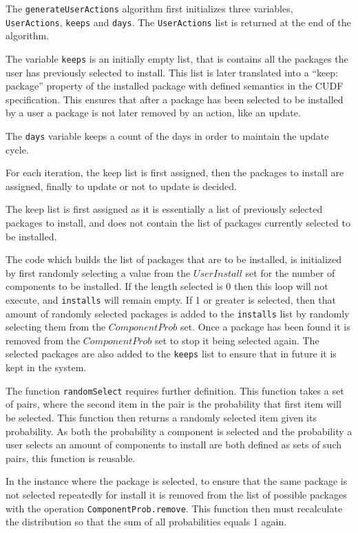 The \verb+generateUserActions+ algorithm first initializes three variables, \verb+UserActions+, \verb+keeps+ and \verb+days+.
The \verb+UserActions+ list is returned at the end of the algorithm.

The variable \verb+keeps+ is an initially empty list, that is contains all the packages the user has previously selected to install.
This list is later translated into a ``keep: package'' property of the installed package with defined semantics in the CUDF specification.
This ensures that after a package has been selected to be installed by a user a package is not later removed by an action, like an update.

The \verb+days+ variable keeps a count of the days in order to maintain the update cycle. 

For each iteration, the keep list is first assigned, then the packages to install are assigned, finally to update or not to update is decided.

The keep list is first assigned as it is essentially a list of previously selected packages to install, and does not contain the list of packages currently selected to be installed.

The code which builds the list of packages that are to be installed, is initialized by first randomly selecting a value from the $UserInstall$ set for the number of components to be installed.
If the length selected is 0 then this loop will not execute, and \verb+installs+ will remain empty.
If 1 or greater is selected, then that amount of randomly selected packages is added to the \verb+installs+ list by randomly selecting them from the $ComponentProb$ set.
Once a package has been found it is removed from the $ComponentProb$ set to stop it being selected again.
The selected packages are also added to the \verb+keeps+ list to ensure that in future it is kept in the system.
 
The function \verb+randomSelect+ requires further definition.
This function takes a set of pairs, where the second item in the pair is the probability that first item will be selected.
This function then returns a randomly selected item given its probability.
As both the probability a component is selected and the probability a user selects an amount of components to install are both defined as sets of such pairs, this function is reusable.

In the instance where the package is selected, to ensure that the same package is not selected repeatedly for install it is removed from the list of possible packages
with the operation \verb+ComponentProb.remove+.
This function then must recalculate the distribution so that the sum of all probabilities equals 1 again.

